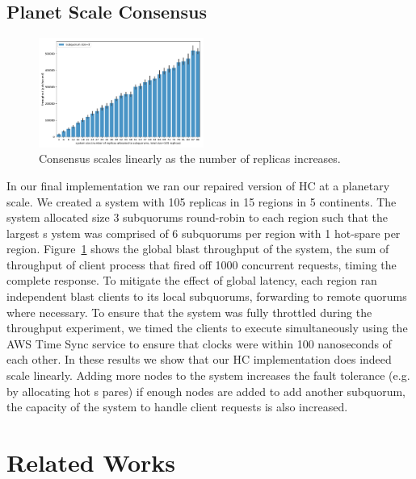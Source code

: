\documentclass[11pt,conference]{IEEEtran}
\begin{document}
\subsection{Planet Scale Consensus}

\begin{figure}
    \centering
    \includegraphics[width=0.48\textwidth]{figures/geoconsensus_throughput}
    \caption{Consensus scales linearly as the number of replicas increases.}
    \label{fig:geoconsensus_throughput}
\end{figure}

In our final implementation we ran our repaired version of HC at a planetary scale.
We created a system with 105 replicas in 15 regions in 5 continents.
The system allocated size 3 subquorums round-robin to each region such that the largest s
ystem was comprised of 6 subquorums per region with 1 hot-spare per region.
Figure~\ref{fig:geoconsensus_throughput} shows the global blast throughput of 
the system, the sum of throughput of client process that fired off 1000 concurrent 
requests, timing the complete response.
To mitigate the effect of global latency, each region ran independent blast clients to 
its local subquorums, forwarding to remote quorums where necessary.
To ensure that the system was fully throttled during the throughput experiment, we timed 
the clients to execute simultaneously using the AWS Time Sync service to ensure that 
clocks were within 100 nanoseconds of each other.
In these results we show that our HC implementation does indeed scale linearly.
Adding more nodes to the system increases the fault tolerance (e.g. by allocating hot s
pares) if enough nodes are added to add another subquorum, the capacity of the system to 
handle client requests is also increased.

\section{Related Works}

\end{document}
